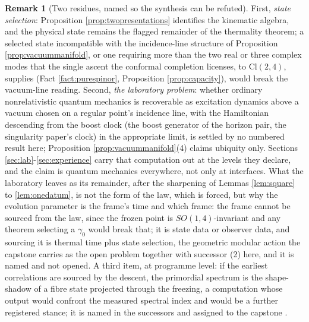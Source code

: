 \documentclass[11pt]{article}
\theoremstyle{definition}
\newtheorem{remark}[theorem]{Remark}
\newcommand{\Cl}{\mathrm{Cl}}
\begin{document}
\begin{remark}[Two residues, named so the synthesis can be refuted]\label{rem:synthesisresidues}
First, \emph{state selection}: Proposition \ref{prop:twopresentations} identifies the kinematic algebra, and the physical state remains the flagged remainder of the thermality theorem; a selected state incompatible with the incidence-line structure of Proposition \ref{prop:vacuummanifold}, or one requiring more than the two real or three complex modes that the single ascent the conformal completion licenses, to $\Cl(2,4)$, supplies (Fact \ref{fact:purespinor}, Proposition \ref{prop:capacity}), would break the vacuum-line reading. Second, \emph{the laboratory problem}: whether ordinary nonrelativistic quantum mechanics is recoverable as excitation dynamics above a vacuum chosen on a regular point's incidence line, with the Hamiltonian descending from the boost clock (the boost generator of the horizon pair, the singularity paper's clock) in the appropriate limit, is settled by no numbered result here; Proposition \ref{prop:vacuummanifold}(4) claims ubiquity only. Sections \ref{sec:lab}-\ref{sec:experience} carry that computation out at the levels they declare, and the claim is quantum mechanics everywhere, not only at interfaces. What the laboratory leaves as its remainder, after the sharpening of Lemmas \ref{lem:square} to \ref{lem:onedatum}, is not the form of the law, which is forced, but why the evolution parameter is the frame's time and which frame: the frame cannot be sourced from the law, since the frozen point is $SO(1,4)$-invariant and any theorem selecting a $\gamma_{0}$ would break that; it is state data or observer data, and sourcing it is thermal time plus state selection, the geometric modular action the capstone carries as the open problem together with successor (2) here, and it is named and not opened. A third item, at programme level: if the earliest correlations are sourced by the descent, the primordial spectrum is the shape-shadow of a fibre state projected through the freezing, a computation whose output would confront the measured spectral index and would be a further registered stance; it is named in the successors and assigned to the capstone \cite{ButlerT17}.
\end{remark}
\end{document}
